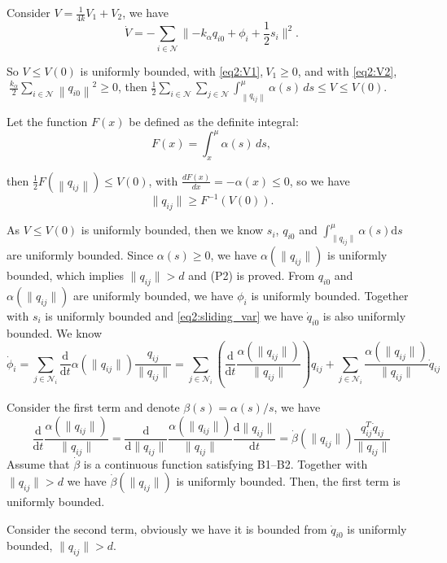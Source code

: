 Consider $V=\frac{1}{4k}V_1+V_2$, we have
\[\dot{V}=-\sum_{i\in\mathcal{N}} \lVert -k_\alpha q_{i0} +\phi_i + \frac{1}{2}s_i\rVert^2.
\]

So $V\leq V(0)$ is uniformly bounded,
with \eqref{eq2:V1},$\ V_1\geq 0$,
and  with \eqref{eq2:V2},$\ \frac{k_\alpha}{2}\sum_{i\in\mathcal{N}}\left\| q_{i0} \right\|^2\geq 0$,
then $\frac{1}{2} \sum_{i\in\mathcal{N}}\sum_{j\in\mathcal{N}}\int_{\left\| q_{ij} \right\|}^{\mu}\alpha(s)\,ds\leq V\leq V(0)$.

Let the function $F(x)$ be defined as the definite integral:
$$
F(x) = \int_{x}^{\mu} \alpha(s) \, ds,
$$

then $\frac{1}{2}F({\left\| q_{ij} \right\|})\leq V(0)$,
with $\frac{dF(x)}{dx} = -\alpha(x) \leq 0$,
so we have
$$
\| q_{ij} \| \geq F^{-1}(V(0)).
$$

As $V\leq V(0)$ is uniformly bounded,
then we know $s_i$, $q_{i0}$ and $\int_{\|q_{ij}\|}^\mu\alpha(s)\mathrm{d} s$ are uniformly bounded.
Since $\alpha(s)\geq 0$, we have $\alpha(\|q_{ij}\|)$ is uniformly bounded, which implies $\|q_{ij}\|>d$ and (P2) is proved.
From $q_{i0}$ and $\alpha(\|q_{ij}\|)$ are uniformly bounded, we have $\phi_i$ is uniformly bounded.
Together with $s_i$ is uniformly bounded and \eqref{eq2:sliding_var} we have $\dot{q}_{i0}$ is also uniformly bounded.
We know
\[
\dot{\phi}_i=\sum_{j\in\mathcal{N}_i} \frac{\mathrm{d}}{\mathrm{d}t}\alpha(\|q_{ij}\|) \frac{q_{ij}}{\|q_{ij}\|}
=\sum_{j\in\mathcal{N}_i} \left(\frac{\mathrm{d}}{\mathrm{d}t} \frac{\alpha(\|q_{ij}\|)}{\|q_{ij}\|}\right)q_{ij}+\sum_{j\in\mathcal{N}_i}  \frac{\alpha(\|q_{ij}\|)}{\|q_{ij}\|}\dot{q}_{ij}
\]

Consider the first term and denote $\beta(s)=\alpha(s)/s$, we have
\[
\frac{\mathrm{d}}{\mathrm{d}t} \frac{\alpha(\|q_{ij}\|)}{\|q_{ij}\|}
=\frac{\mathrm{d}}{\mathrm{d}\|q_{ij}\|}
\frac{\alpha(\|q_{ij}\|)}{\|q_{ij}\|}
\frac{\mathrm{d} \|q_{ij}\|}{\mathrm{d}t}
= \dot{\beta}(\|q_{ij}\|)\frac{q_{ij}^T\dot{q}_{ij}}{\|q_{ij}\|}
\]
Assume that $\dot{\beta}$ is a continuous function satisfying B1--B2. Together with $\|q_{ij}\|>d$ we have $\dot{\beta}(\|q_{ij}\|)$ is uniformly bounded.
Then, the first term is uniformly bounded.

Consider the second term,  obviously we have it is bounded from $\dot{q}_{i0}$ is uniformly bounded, $\|q_{ij}\|>d$.

